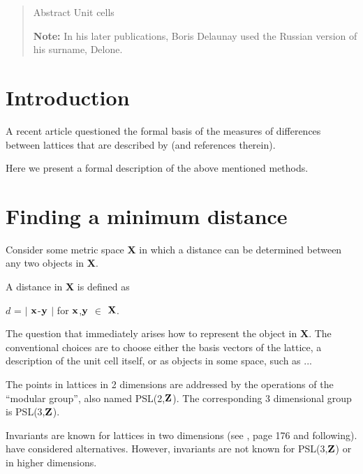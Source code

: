 \documentclass[preprint]{iucr}              %
\numberwithin{equation}{section}
\begin{document}
	\newcommand{\ci}[0]{$c_1$}
	\newcommand{\cii}[0]{$c_2$}
	\newcommand{\ciii}[0]{$c_3$}
	
	
	\begin{abstract}
		Abstract Unit cells
		
		{\bf Note:}  In his later publications, Boris Delaunay used the Russian version of his surname, Delone.\\
		
		
	\end{abstract}
	
	
	\section{Introduction}
	
	A recent article \cite{bright2023continuous}
	questioned the formal basis of the measures 
	of differences between lattices that are described by
	 (and references therein).
	
	Here we present a formal description of the above mentioned methods.
	
	\section{Finding a minimum distance}
	\label{finding}
	Consider some metric space \textbf{X} in which a distance can 
	be determined between any two objects in \textbf{X}.
	
	A distance in \textbf{X} is defined as 
	
	$d$ = $\big|$ $\bf{x}$-$\bf{y}$ $\big|$ for $\bf{x}$,$\bf{y}$ $\in$ $\bf{X}$.
	
	The question that immediately arises how to represent
	the object in \textbf{X}. The conventional choices are
	to choose either the basis vectors of the lattice,
	a description of the unit cell itself, or as objects
	in some space, such as ...
	
	The points in lattices in 2 dimensions are addressed
	by the operations of the ``modular group'', also
	named PSL(2,$\bf{Z}$). The corresponding 3 dimensional
	group is PSL(3,$\bf{Z}$).
	
	Invariants are known for lattices in two dimensions 
	(see , page 176 and 
	following).  have
	considered alternatives. However, invariants are
	not known for PSL(3,$\bf{Z}$) or in higher dimensions.
	
\end{document}
